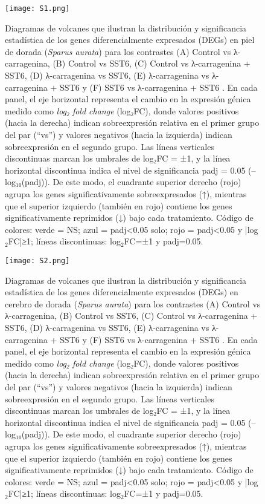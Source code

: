 \documentclass[10pt,a4paper]{article}
\begin{document}
\begin{figure}[ht]
  \centering
  \texttt{[image: S1.png]}%
  \caption[Volcano plots de DEGs en piel]{%
    Diagramas de volcanes que ilustran la distribución y significancia estadística de los genes diferencialmente expresados (DEGs) en piel de dorada (\textit{Sparus aurata}) para los contrastes  (A) Control vs λ-carragenina, (B) Control vs SST6, (C) Control vs λ-carragenina + SST6, (D) λ-carragenina vs SST6, (E) λ-carragenina vs λ-carragenina + SST6 y (F) SST6 vs λ-carragenina + SST6 . En cada panel, el eje horizontal representa el cambio en la expresión génica medido como \textit{log₂ fold change} (log₂FC), donde valores positivos (hacia la derecha) indican sobreexpresión relativa en el primer grupo del par (“vs”) y valores negativos (hacia la izquierda) indican sobreexpresión en el segundo grupo. Las líneas verticales discontinuas marcan los umbrales de log₂FC = ±1, y la línea horizontal discontinua indica el nivel de significancia padj = 0.05 (–log₁₀(padj)). De este modo, el cuadrante superior derecho (rojo) agrupa los genes significativamente sobreexpresados (↑), mientras que el superior izquierdo (también en rojo) contiene los genes significativamente reprimidos (↓) bajo cada tratamiento.  Código de colores: verde = NS; azul = padj<0.05 solo; rojo = padj<0.05 y |log$_2$FC|≥1; líneas discontinuas: log$_2$FC=±1 y padj=0.05.
  }
  \label{fig:S1}
\end{figure}


\begin{figure}[ht]
  \centering
  \texttt{[image: S2.png]}%
  \caption[Volcano plots de DEGs en cerebro]{%
    Diagramas de volcanes que ilustran la distribución y significancia estadística de los genes diferencialmente expresados (DEGs) en  cerebro de dorada (\textit{Sparus aurata}) para los contrastes (A) Control vs λ-carragenina, (B) Control vs SST6, (C) Control vs λ-carragenina + SST6, (D) λ-carragenina vs SST6, (E) λ-carragenina vs λ-carragenina + SST6 y (F) SST6 vs λ-carragenina + SST6 . En cada panel, el eje horizontal representa el cambio en la expresión génica medido como \textit{log₂ fold change} (log₂FC), donde valores positivos (hacia la derecha) indican sobreexpresión relativa en el primer grupo del par (“vs”) y valores negativos (hacia la izquierda) indican sobreexpresión en el segundo grupo. Las líneas verticales discontinuas marcan los umbrales de log₂FC = ±1, y la línea horizontal discontinua indica el nivel de significancia padj = 0.05 (–log₁₀(padj)). De este modo, el cuadrante superior derecho (rojo) agrupa los genes significativamente sobreexpresados (↑), mientras que el superior izquierdo (también en rojo) contiene los genes significativamente reprimidos (↓) bajo cada tratamiento.  Código de colores: verde = NS; azul = padj<0.05 solo; rojo = padj<0.05 y |log$_2$FC|≥1; líneas discontinuas: log$_2$FC=±1 y padj=0.05.
  }
  \label{fig:S2}
\end{figure}
\end{document}

